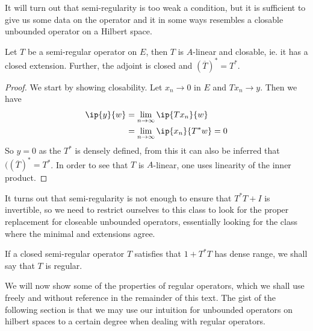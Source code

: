 It will turn out that semi-regularity is too weak a condition, but it is sufficient to give us some data on the operator and it in some ways resembles a closable unbounded operator on a Hilbert space. 
\begin{lemma}
	Let $T$ be a semi-regular operator on $E$, then $T$ is $A$-linear and closable, ie. it has a closed extension. Further, the adjoint is closed and $(\overline{T})^*=T^*$. 
\end{lemma}
\begin{proof}
	We start by showing closability. Let $x_n\to 0$ in $E$ and $Tx_n\to y$. Then we have
	\begin{align*}
		\ip{y}{w}&=\lim_{n\to\infty} \ip{Tx_n}{w} \\
		&=\lim_{n\to\infty}\ip{x_n}{T^*w}=0
	\end{align*}
	So $y=0$ as the $T^*$ is densely defined, from this it can also be inferred that $((\overline{T})^*=T^*$. In order to see that $T$ is $A$-linear, one uses linearity of the inner product. 
\end{proof}
It turns out that semi-regularity is not enough to ensure that $T^*T+I$ is invertible, so we need to restrict ourselves to this class to look for the proper  replacement for closeable unbounded operators, essentially looking for the class where the minimal and extensions agree.
\begin{definition}
	If a closed semi-regular operator $T$ satisfies that $1+T^*T$ has dense range, we shall say that $T$ is regular. 
\end{definition}
We will now show some of the properties of regular operators, which we shall use freely and without reference in the remainder of this text. The gist of the following section is that we may use our intuition for unbounded operators on hilbert spaces to a certain degree when dealing with regular operators. 


